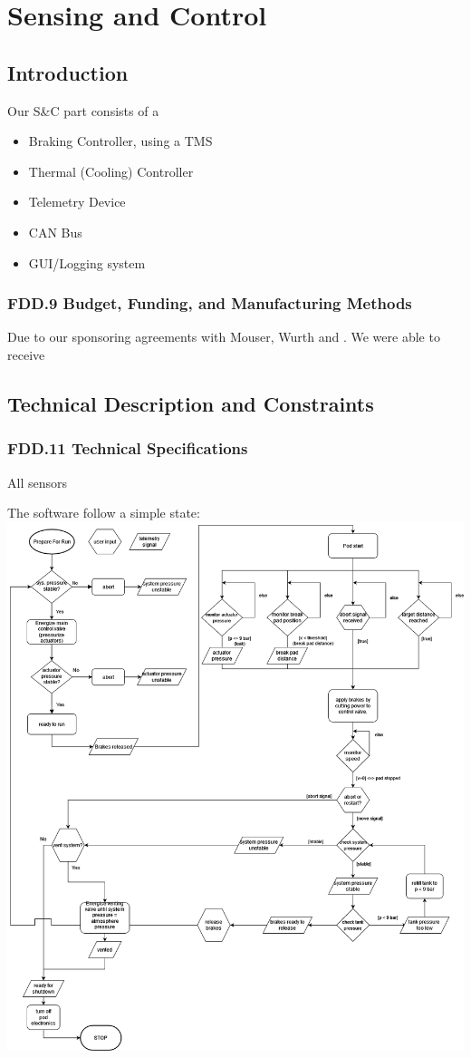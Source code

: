 \section{Sensing and Control}

\subsection{Introduction}
Our S\&C part consists of a 
\begin{itemize}
    \item Braking Controller, using a TMS
    \item Thermal (Cooling) Controller
    \item Telemetry Device
    \item CAN Bus
    \item GUI/Logging system
\end{itemize}

\subsubsection{FDD.9 Budget, Funding, and Manufacturing Methods}
Due to our sponsoring agreements with Mouser, Wurth and . We were able to receive
 
\subsection{Technical Description and Constraints}
\subsubsection{FDD.11 Technical Specifications}
All sensors 

The software follow a simple state: \\
\includegraphics[width=\textwidth]{texfiles/elec/eimg/brakesoftware_ext}
 

